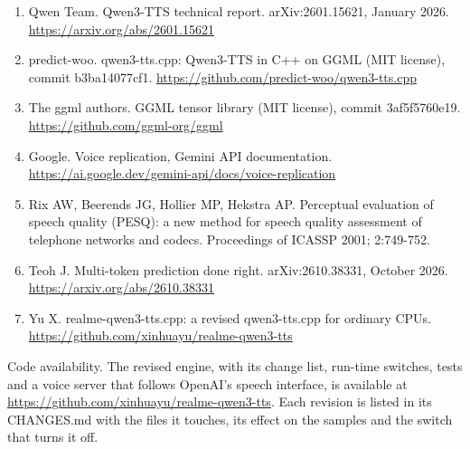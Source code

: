 \documentclass[11pt]{article}
\providecommand{\tightlist}{\setlength{\itemsep}{0pt}\setlength{\parskip}{0pt}}
\begin{document}
\begin{enumerate}
\def\labelenumi{\arabic{enumi}.}
\tightlist
\item
  Qwen Team. Qwen3-TTS technical report. arXiv:2601.15621, January 2026.
  \url{https://arxiv.org/abs/2601.15621}
\item
  predict-woo. qwen3-tts.cpp: Qwen3-TTS in C++ on GGML (MIT license),
  commit b3ba14077cf1.
  \url{https://github.com/predict-woo/qwen3-tts.cpp}
\item
  The ggml authors. GGML tensor library (MIT license), commit
  3af5f5760e19. \url{https://github.com/ggml-org/ggml}
\item
  Google. Voice replication, Gemini API documentation.
  \url{https://ai.google.dev/gemini-api/docs/voice-replication}
\item
  Rix AW, Beerends JG, Hollier MP, Hekstra AP. Perceptual evaluation of
  speech quality (PESQ): a new method for speech quality assessment of
  telephone networks and codecs. Proceedings of ICASSP 2001; 2:749-752.
\item
  Teoh J. Multi-token prediction done right. arXiv:2610.38331, October
  2026. \url{https://arxiv.org/abs/2610.38331}
\item
  Yu X. realme-qwen3-tts.cpp: a revised qwen3-tts.cpp for ordinary CPUs.
  \url{https://github.com/xinhuayu/realme-qwen3-tts}
\end{enumerate}

Code availability. The revised engine, with its change list, run-time
switches, tests and a voice server that follows OpenAI's speech
interface, is available at
\url{https://github.com/xinhuayu/realme-qwen3-tts}. Each revision is
listed in its CHANGES.md with the files it touches, its effect on the
samples and the switch that turns it off.
\end{document}
